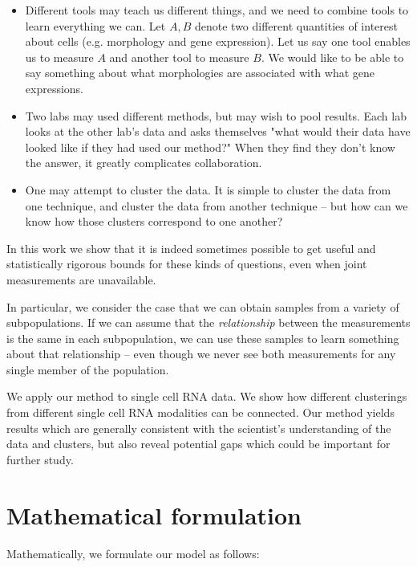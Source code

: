 \begin{itemize}

\item Different tools may teach us different things, and we need to combine tools
to learn everything we can.  Let $A,B$ denote two different quantities of interest about cells (e.g. morphology and gene expression).   Let us say one tool enables us to measure $A$ and another tool to measure $B$.  We would like
to be able to say something about what morphologies are associated with what gene expressions.  

\item Two labs may used different methods, but may wish to pool results.  Each lab looks at the other
lab's data and asks themselves "what would their data have looked like if they had used our method?"  When
they find they don't know the answer, it greatly complicates collaboration.

\item One may attempt to cluster the data.  It is simple to cluster the data from one technique, and cluster the data
from another technique -- but how can we know how those clusters correspond to one another?  

\end{itemize}

In this work we show that it is indeed sometimes possible to get useful and statistically rigorous bounds for these kinds of questions, even when joint measurements are unavailable.   

In particular, we consider the case that we can obtain samples from a variety of subpopulations.  If we can assume that the \emph{relationship} between the measurements is the same in each subpopulation, we can use these samples to learn something about that relationship -- even though we never see both measurements for any single member of the population.  

We apply our method to single cell RNA data.  We show how different clusterings from different single cell RNA modalities can be connected.  Our method yields results which are generally consistent with the scientist's understanding of the data and clusters, but also reveal potential gaps which could be important for further study.

\section{Mathematical formulation}

Mathematically, we formulate our model as follows:

